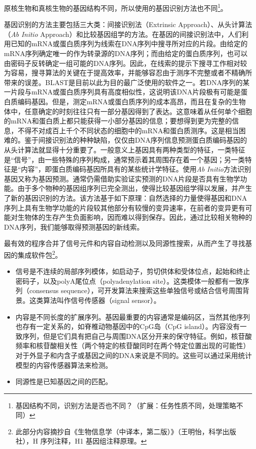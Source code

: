 \documentclass[11pt,a4paper,twoside]{book}
\begin{document}
原核生物和真核生物的基因结构不同，所以使用的基因识别方法也不同\footnote{基因结构不同，识别方法是否也不同？（扩展：任务性质不同，处理策略不同）}。

基因识别的方法主要包括三大类：间接识别法（Extrinsic Approach）、从头计算法（\textit{Ab Initio} Approach）和比较基因组学的方法。在基因的间接识别法中，人们利用已知的mRNA或蛋白质序列为线索在DNA序列中搜寻所对应的片段。由给定的mRNA序列确定唯一的作为转录源的DNA序列；而由给定的蛋白质序列，也可以由密码子反转确定一组可能的DNA序列。因此，在线索的提示下搜寻工作相对较为容易，搜寻算法的关键在于提高效率，并能够容忍由于测序不完整或者不精确所带来的误差。BLAST是目前以此为目的最广泛使用的软件之一。若DNA序列的某一片段与mRNA或蛋白质序列具有高度相似性，这说明该DNA片段极有可能是蛋白质编码基因。但是，测定mRNA或蛋白质序列的成本高昂，而且在复杂的生物体中，任意确定的时刻往往只有一部分基因得到了表达。这意味着从任何单个细胞的mRNA和蛋白质上都只能获得一小部分基因的信息；要想得到更为完整的信息，不得不对成百上千个不同状态的细胞中的mRNA和蛋白质测序。这是相当困难的。鉴于间接识别法的种种缺陷，仅仅由DNA序列信息预测蛋白质编码基因的从头计算法就显得十分重要了。一般意义上基因具有两种类型的特征，一类特征是“信号”，由一些特殊的序列构成，通常预示着其周围存在着一个基因；另一类特征是“内容”，即蛋白质编码基因所具有的某些统计学特征。使用\textit{Ab Initio}方法识别基因又称为基因预测。通常仍需借助实验证实预测的DNA片段是否具有生物学功能。由于多个物种的基因组序列已完全测出，使得比较基因组学得以发展，并产生了新的基因识别的方法。该方法基于如下原理：自然选择的力量使得基因和DNA序列上具有生物学功能的片段较其他部分有较慢的变异速率，在前者的变异更有可能对生物体的生存产生负面影响，因而难以得到保存。因此，通过比较相关物种的DNA序列，我们能够取得预测基因的新线索。

最有效的程序合并了信号元件和内容自动检测以及同源性搜索，从而产生了寻找基因的集成软件包\footnote{此部分内容摘抄自《生物信息学（中译本，第二版）》（王明怡，科学出版社），H 序列注释，H1 基因组注释原理。}。
\begin{itemize}
  \item 信号是不连续的局部序列模体，如启动子，剪切供体和受体位点，起始和终止密码子，以及polyA尾位点（polyadenylation site）。这类模体一般都有一致序列（consensus sequence），可开发算法来搜索这些单独信号或结合信号周围背景。这类算法叫作信号传感器（signal sensor）。
  \item 内容是不同长度的扩展序列。基因最重要的内容通常是编码区，当然其他序列也存有一定关系的，如脊椎动物基因中的CpG岛（CpG island）。内容没有一致序列，但是它们具有把自己与周围DNA区分开来的保守特征。例如，核苷酸频率和核苷酸相关性（两个特定的核苷酸同时在两个特定位置出现的可能性）对于外显子和内含子或基因之间的DNA来说是不同的。这些可以通过采用统计模型的内容传感器算法来检测。
  \item 同源性是已知基因之间的匹配。
\end{itemize}
\end{document}
